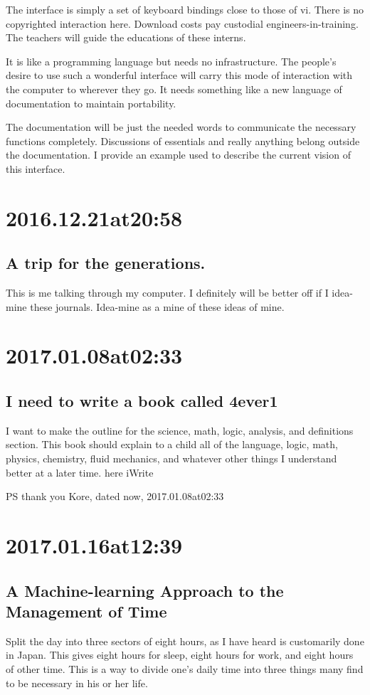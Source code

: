 \begin{enumerate}
\begin{enumerate}
The interface is simply a set of keyboard bindings close to those of vi.
There is no copyrighted interaction here.
Download costs pay custodial engineers-in-training.
The teachers will guide the educations of these interns.

It is like a programming language but needs no infrastructure.
The people's desire to use such a wonderful interface will carry this mode of interaction with the computer to wherever they go.
It needs something like a new language of documentation to maintain portability.

The documentation will be just the needed words to communicate the necessary functions completely. Discussions of essentials and really anything belong outside the documentation. I provide an example used to describe the current vision of this interface.

\section*{ 2016.12.21at20:58 }
\subsection*{ A trip for the generations. }
This is me talking through my computer. I definitely will be better off if I idea-mine these journals. Idea-mine as a mine of these ideas of mine.

\section*{ 2017.01.08at02:33 }
\subsection*{ I need to write a book called 4ever1 }
I want to make the outline for the science, math, logic, analysis, and definitions section.
This book should explain to a child all of the language, logic, math, physics, chemistry, fluid mechanics, and whatever other things I understand better at a later time.
here iWrite

PS thank you Kore, dated now, 2017.01.08at02:33

\section*{ 2017.01.16at12:39 }
\subsection*{ A Machine-learning Approach to the Management of Time }
Split the day into three sectors of eight hours, as I have heard is customarily done in Japan.
This gives eight hours for sleep, eight hours for work, and eight hours of other time.
This is a way to divide one's daily time into three things many find to be necessary in his or her life.


\end{enumerate}
\end{enumerate}
